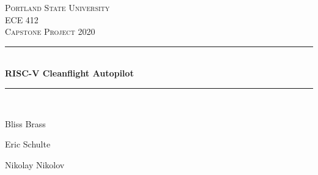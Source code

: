 \begin{titlepage} %
	\newcommand{\HRule}{\rule{\linewidth}{0.5mm}} %
	\centering %
	
	
	\textsc{Portland State University}\\[1.5cm] %
	
	\textsc{ECE 412}\\[0.5cm] %
	
	\textsc{Capstone Project 2020}\\[0.5cm] %
	
	
	\HRule\\[0.4cm]
	
	{\huge\bfseries RISC-V Cleanflight Autopilot}\\[0.4cm] %
	
	\HRule\\[1.5cm]
	
	
	\begin{minipage}{\textwidth}
		\begin{center}
			Bliss Brass \\ %
		\end{center}
	\end{minipage}

	\begin{minipage}{\textwidth}
		\begin{center}
			Eric Schulte \\ %
		\end{center}
	\end{minipage}

	\begin{minipage}{\textwidth}
		\begin{center}
			Nikolay Nikolov \\ %
		\end{center}
	\end{minipage}


\end{titlepage}

